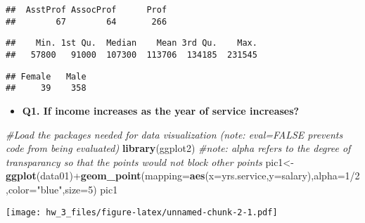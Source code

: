 \documentclass[]{article}
\newenvironment{Shaded}{\begin{snugshade}}{\end{snugshade}}
\newcommand{\KeywordTok}[1]{\textcolor[rgb]{0.13,0.29,0.53}{\textbf{{#1}}}}
\newcommand{\DataTypeTok}[1]{\textcolor[rgb]{0.13,0.29,0.53}{{#1}}}
\newcommand{\DecValTok}[1]{\textcolor[rgb]{0.00,0.00,0.81}{{#1}}}
\newcommand{\StringTok}[1]{\textcolor[rgb]{0.31,0.60,0.02}{{#1}}}
\newcommand{\CommentTok}[1]{\textcolor[rgb]{0.56,0.35,0.01}{\textit{{#1}}}}
\newcommand{\NormalTok}[1]{{#1}}
\providecommand{\tightlist}{%
  \setlength{\itemsep}{0pt}\setlength{\parskip}{0pt}}
\begin{document}
\begin{verbatim}
##  AsstProf AssocProf      Prof 
##        67        64       266
\end{verbatim}

\begin{Shaded}
\end{Shaded}

\begin{verbatim}
##    Min. 1st Qu.  Median    Mean 3rd Qu.    Max. 
##   57800   91000  107300  113706  134185  231545
\end{verbatim}

\begin{Shaded}
\end{Shaded}

\begin{verbatim}
## Female   Male 
##     39    358
\end{verbatim}

\begin{itemize}
\tightlist
\item
  \textbf{Q1. If income increases as the year of service increases? }
\end{itemize}

\begin{Shaded}
\begin{Highlighting}[]
\CommentTok{#Load the packages needed for data visualization (note: eval=FALSE prevents code from being evaluated)}
\KeywordTok{library}\NormalTok{(ggplot2)}
\CommentTok{#note: alpha refers to the degree of transparancy so that the points would not block other points}
\NormalTok{pic1<-}\KeywordTok{ggplot}\NormalTok{(data01)+}\KeywordTok{geom_point}\NormalTok{(}\DataTypeTok{mapping=}\KeywordTok{aes}\NormalTok{(}\DataTypeTok{x=}\NormalTok{yrs.service,}\DataTypeTok{y=}\NormalTok{salary),}\DataTypeTok{alpha=}\DecValTok{1}\NormalTok{/}\DecValTok{2}\NormalTok{,}\DataTypeTok{color=}\StringTok{"blue"}\NormalTok{,}\DataTypeTok{size=}\DecValTok{5}\NormalTok{)}
\NormalTok{pic1}
\end{Highlighting}
\end{Shaded}

\texttt{[image: hw\_3\_files/figure-latex/unnamed-chunk-2-1.pdf]}
\end{document}
